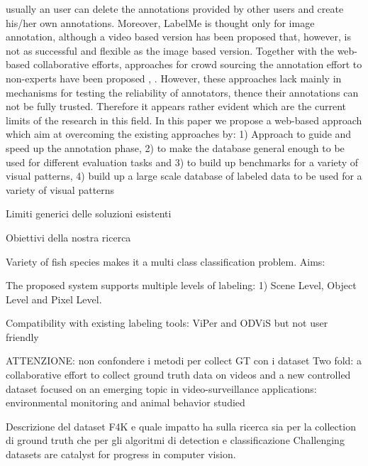 usually an user can delete the annotations provided by other users and create his/her own annotations. Moreover, LabelMe is thought only for image annotation, although a video based version has been proposed that, however, is not as successful and flexible as the image based version.
Together with the web-based collaborative efforts, approaches for crowd sourcing the annotation effort to non-experts have been proposed \cite{}, \cite{}. However, these approaches lack mainly in mechanisms for testing the reliability of annotators, thence their annotations can not be fully trusted. 
Therefore it appears rather evident which are the current limits of the research in this field. In this paper we propose a web-based approach which aim at overcoming the existing approaches by: 
1) Approach to guide and speed up the annotation phase, 2) to make the database general enough to be used for different evaluation tasks and 3) to build up benchmarks for a variety of visual patterns, 4) build up a large scale database of labeled data to be used for a variety of visual patterns


\item Limiti generici delle soluzioni esistenti
\item Obiettivi della nostra ricerca

Variety of fish species makes it a multi class classification problem.
Aims:

The proposed system supports multiple levels of labeling: 1) Scene Level, Object Level and Pixel Level.

Compatibility with existing labeling tools: ViPer and ODViS but not user friendly 

ATTENZIONE: non confondere i metodi per collect GT con i dataset
Two fold: a collaborative effort to collect ground truth data on videos and a new controlled dataset focused on an emerging topic in video-surveillance applications: environmental monitoring and animal behavior studied

\item Descrizione del dataset F4K e quale impatto ha sulla ricerca sia per la collection di ground truth che per gli algoritmi di detection e classificazione
Challenging datasets are catalyst for progress in computer vision.

